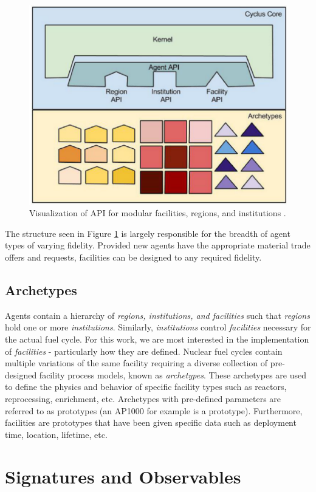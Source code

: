 \begin{figure}
	\centering
	\includegraphics[width=0.7\linewidth]{images/cyclus-core}
	\caption{Visualization of \Cyclus API for modular facilities, regions, and institutions \cite{huff_fundamental_2016}.}
	\label{fig:cyc-api}
\end{figure}

The structure seen in Figure \ref{fig:cyc-api} is largely responsible for the breadth of agent types of varying fidelity. Provided new agents have the appropriate material trade offers and requests,
facilities can be designed to any required fidelity.

\subsection{Archetypes}

Agents contain a hierarchy of \emph{regions, institutions, and facilities} such that \emph{regions} hold one or more \emph{institutions}. Similarly, \emph{institutions}
control \emph{facilities} necessary for the actual fuel cycle. For this work, we are most interested in the implementation of \emph{facilities} - particularly how they are defined.
Nuclear fuel cycles contain multiple variations of the same facility requiring a diverse collection of pre-designed facility process models, known as \emph{archetypes}.
These archetypes are used to define the physics and behavior of specific facility types such as reactors, reprocessing, enrichment, etc. Archetypes with pre-defined parameters are referred
to as prototypes (an AP1000 for example is a prototype). Furthermore, facilities are prototypes that have been given specific data such as deployment time, location, lifetime, etc.

\section{Signatures and Observables}

